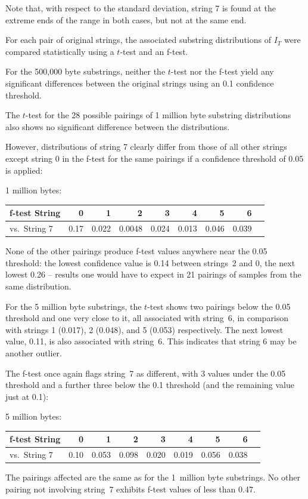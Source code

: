 \documentclass[10pt]{article}%
\begin{document}
Note that, with respect to the standard deviation, string 7 is found at the extreme ends of the range in both cases, but not at the same end.

For each pair of original strings, the associated substring distributions of $I_T$ were compared statistically using a $t$-test and an f-test.

For the 500,000 byte substrings, neither the $t$-test nor the f-test yield any significant differences between the original strings using an 0.1 confidence threshold.

The $t$-test for the 28 possible pairings of 1 million byte substring distributions also shows no significant difference between the distributions.

However, distributions of string 7 clearly differ from those of all other strings except string 0 in the f-test for the same pairings if a
confidence threshold of 0.05 is applied:

1 million bytes:\\
{\small
\begin{tabular}{ l| r r r r r r r r }
\hline
f-test String & 0 & 1 & 2 & 3 & 4 & 5 & 6 \\
\hline
vs.\ String 7& 0.17  & 0.022 & 0.0048 & 0.024 & 0.013 & 0.046 & 0.039 \\
\hline
\end{tabular}}

None of the other pairings produce f-test values anywhere near the 0.05 threshold: the lowest confidence value is 0.14 between strings~2 and 0,
the next lowest 0.26 -- results one would have to expect in 21 pairings of samples from the same distribution.

For the 5 million byte substrings, the $t$-test shows two pairings below the 0.05 threshold and one very close to it, all associated with string~6,
in comparison with strings 1 (0.017), 2 (0.048), and 5 (0.053) respectively. The next lowest value, 0.11, is also associated with string~6.
This indicates that string 6 may be another outlier.

The f-test once again flags string~7 as different, with 3 values under the 0.05 threshold and a further three below the 0.1 threshold (and the remaining
value just at 0.1):

5 million bytes:\\
{\small
\begin{tabular}{ l| r r r r r r r r }
\hline
f-test String & 0 & 1 & 2 & 3 & 4 & 5 & 6 \\
\hline
vs.\ String 7& 0.10  & 0.053 & 0.098 & 0.020 & 0.019 & 0.056 & 0.038 \\
\hline
\end{tabular}}
The pairings affected are the same as for the 1~million byte substrings. No other pairing not involving string~7 exhibits f-test values of less than 0.47.
\end{document}
